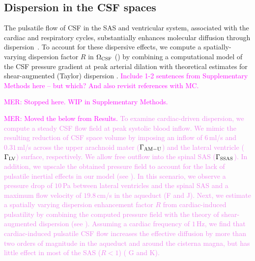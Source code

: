 \documentclass[fleqn,10pt]{wlscirep}
\newcommand{\mer}[1]{\textcolor{magenta}{#1}}
\newcommand{\mar}[1]{\textcolor{violet}{#1}}
\begin{document}
\subsection*{Dispersion in the CSF spaces}


The pulsatile flow of CSF in the SAS and ventricular system,
associated with the cardiac and respiratory cycles, substantially
enhances molecular diffusion through
dispersion~\cite{taylor1953dispersion, watson1983diffusion,
  asgari2016glymphatic, keith2019dispersion, ray2021quantitative,
  troyetsky2021dispersion}. To account for these dispersive effects,
we compute a spatially-varying dispersion factor $R$ in $\Omega_{\rm
  CSF}$ () by combining a computational model of
the CSF pressure gradient at peak arterial dilation with theoretical
estimates for shear-augmented (Taylor) dispersion
\cite{taylor1953dispersion, watson1983diffusion, keith2019dispersion}. \mer{Include 1-2 sentences from Supplementary Methods here -- but which? And also revisit references with MC.}

\mer{MER: Stopped here. WIP in Supplementary Methods. }

\mer{MER: Moved the below from Results.}
\mar{To examine cardiac-driven dispersion, we compute a steady CSF flow field at peak systolic blood inflow. We mimic the resulting reduction of CSF space volume by imposing an inflow of $6\,$ml/s \cite{baledent2014imaging, causemann2022human} and $0.31\,$ml/s \cite{vinje2019respiratory} across the upper arachnoid mater ($\Gamma_{\rm AM-U}$) and the lateral ventricle ($\Gamma_{\rm LV}$) surface, respectively. We allow free outflow into the spinal SAS ($\Gamma_{\rm SSAS}$). In addition, we upscale the obtained pressure field to account for the lack of pulsatile inertial effects in our model (see \Cref{sec:csf_dispersion}). In this scenario, we observe a pressure drop of $10\,$Pa between lateral ventricles and the spinal SAS and a maximum flow velocity of $19.8\,$cm/s in the aqueduct (\Cref{fig:csf}F and J).
Next, we estimate a spatially varying dispersion enhancement factor $R$ from cardiac-induced pulsatility by combining the computed pressure field with the theory of shear-augmented dispersion (see \Cref{sec:csf_dispersion}). Assuming a cardiac frequency of $1\,$Hz, we find that cardiac-induced pulsatile CSF flow increases the effective diffusion by more than two orders of magnitude in the aqueduct and around the cisterna magna, but has little effect in most of the SAS ($R < 1$) (\Cref{fig:csf} G and K). }
\end{document}
